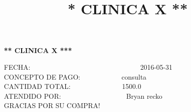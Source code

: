 \documentclass[10pt,a4paper]{letter}
\title{\bf ** CLINICA X **}
\begin{document}
\begin{center}
{\scshape\LARGE \bf *** CLINICA X ***\par}

\end{center}

FECHA:\ \ \ \ \ \ \ \ \ \ \ \ \ \ \ \ \ \ \ \ \ \ \ \ \ \ \ \ \ \ \ \ 2016-05-31 \\
CONCEPTO DE PAGO:\ \ \ \ \ \ \ \ \ \  \ \ consulta \\
CANTIDAD TOTAL:\ \ \ \ \ \ \ \ \ \ \ \ \ \ \ 1500.0 \\
ATENDIDO POR:\ \ \ \ \ \ \ \ \ \ \ \ \ \ \ \ \ \ \ Bryan recko \\
GRACIAS POR SU COMPRA! \\ \\

 
\end{document}
